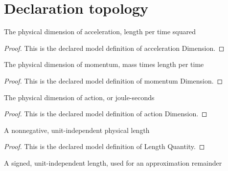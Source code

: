 \section{Declaration topology}
\begin{definition}
  \label{def:physics:phyx-mini-0507:phyxminiproblems-problemphyxmini0507-accelerationdimension}
  The physical dimension of acceleration, length per time squared
\end{definition}
\begin{proof}
  This is the declared model definition of acceleration Dimension.
\end{proof}
\begin{definition}
  \label{def:physics:phyx-mini-0507:phyxminiproblems-problemphyxmini0507-momentumdimension}
  The physical dimension of momentum, mass times length per time
\end{definition}
\begin{proof}
  This is the declared model definition of momentum Dimension.
\end{proof}
\begin{definition}
  \label{def:physics:phyx-mini-0507:phyxminiproblems-problemphyxmini0507-actiondimension}
  The physical dimension of action, or joule-seconds
\end{definition}
\begin{proof}
  This is the declared model definition of action Dimension.
\end{proof}
\begin{definition}
  \label{def:physics:phyx-mini-0507:phyxminiproblems-problemphyxmini0507-lengthquantity}
  A nonnegative, unit-independent physical length
\end{definition}
\begin{proof}
  This is the declared model definition of Length Quantity.
\end{proof}
\begin{definition}
  \label{def:physics:phyx-mini-0507:phyxminiproblems-problemphyxmini0507-signedlengthquantity}
  A signed, unit-independent length, used for an approximation remainder
\end{definition}
